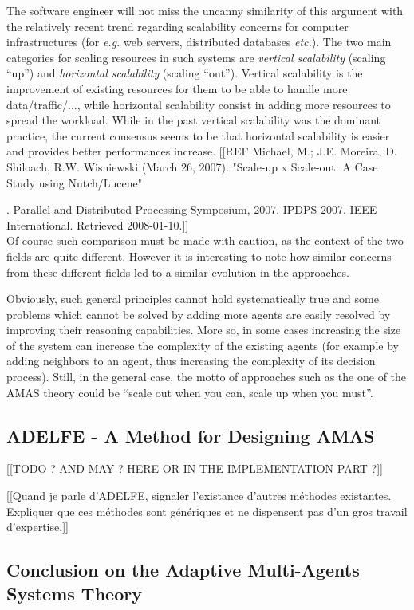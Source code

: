 The software engineer will not miss the uncanny similarity of this argument with the relatively recent trend regarding scalability concerns for computer infrastructures (for \emph{e.g.} web servers, distributed databases \emph{etc.}). The two main categories for scaling resources in such systems are \emph{vertical scalability} (scaling \enquote{up}) and \emph{horizontal scalability} (scaling \enquote{out}). Vertical scalability is the improvement of existing resources for them to be able to handle more data/traffic/..., while horizontal scalability consist in adding more resources to spread the workload. While in the past vertical scalability was the dominant practice, the current consensus seems to be that horizontal scalability is easier and provides better performances increase. 
[[REF Michael, M.; J.E. Moreira, D. Shiloach, R.W. Wisniewski (March 26, 2007). "Scale-up x Scale-out: A Case Study using Nutch/Lucene"
 
. Parallel and Distributed Processing Symposium, 2007. IPDPS 2007. IEEE International. Retrieved 2008-01-10.]]\\
Of course such comparison must be made with caution, as the context of the two fields are quite different. However it is interesting to note how similar concerns from these different fields led to a similar evolution in the approaches.

Obviously, such general principles cannot hold systematically true and some problems which cannot be solved by adding more agents are easily resolved by improving their reasoning capabilities. More so, in some cases increasing the size of the system can increase the complexity of the existing agents (for example by adding neighbors to an agent, thus increasing the complexity of its decision process). Still, in the general case, the motto of approaches such as the one of the AMAS theory could be \enquote{scale out when you can, scale up when you must}. 

\subsection{ADELFE - A Method for Designing AMAS} 
[[TODO ? AND MAY ? HERE OR IN THE IMPLEMENTATION PART ?]]

[[Quand je parle d'ADELFE, signaler l'existance d'autres méthodes existantes. Expliquer que ces méthodes sont génériques et ne dispensent pas d'un gros travail d'expertise.]]

\subsection{Conclusion on the Adaptive Multi-Agents Systems Theory}

